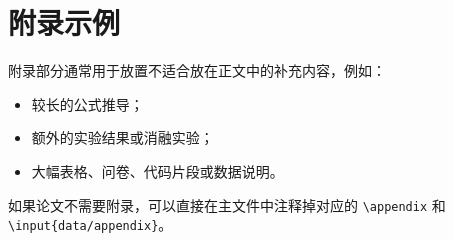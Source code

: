 
\chapter{附录示例}

附录部分通常用于放置不适合放在正文中的补充内容，例如：

\begin{itemize}
    \item 较长的公式推导；
    \item 额外的实验结果或消融实验；
    \item 大幅表格、问卷、代码片段或数据说明。
\end{itemize}

如果论文不需要附录，可以直接在主文件中注释掉对应的 \texttt{\textbackslash appendix} 和 \texttt{\textbackslash input\{data/appendix\}}。
